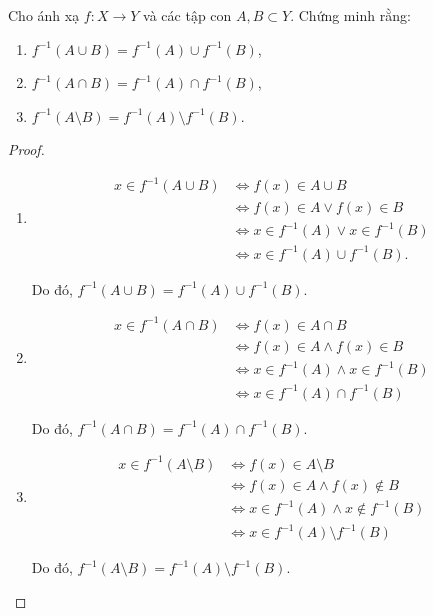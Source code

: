 \begin{exercise}Cho ánh xạ $f: X\rightarrow Y$ và các tập con $A, B\subset Y$. Chứng minh rằng:
    \begin{enumerate}[itemsep=0pt,label = (\alph*)]
        \item $f^{-1}(A\cup B) = f^{-1}(A)\cup f^{-1}(B)$,
        \item $f^{-1}(A\cap B) = f^{-1}(A)\cap f^{-1}(B)$,
        \item $f^{-1}(A\setminus B) = f^{-1}(A)\setminus f^{-1}(B)$.
    \end{enumerate}
\end{exercise}

\begin{proof}
    \begin{enumerate}[label = (\alph*)]
        \item
              \begin{align*}
                 x\in f^{-1}(A\cup B)  & \Longleftrightarrow  f(x) \in A\cup B                   \\
                  & \Longleftrightarrow  f(x)\in A \lor f(x)\in B           \\
                  & \Longleftrightarrow  x\in f^{-1}(A) \lor x\in f^{-1}(B) \\
                  & \Longleftrightarrow  x\in f^{-1}(A)\cup f^{-1}(B).
              \end{align*}

              Do đó, $f^{-1}(A\cup B) = f^{-1}(A)\cup f^{-1}(B)$.
        \item
              \begin{align*}
                x\in f^{-1}(A\cap B) &\Longleftrightarrow f(x) \in A\cap B                     \\
                  &\Longleftrightarrow f(x) \in A \land f(x) \in B         \\
                  &\Longleftrightarrow x\in f^{-1}(A) \land x\in f^{-1}(B) \\
                  &\Longleftrightarrow x\in f^{-1}(A)\cap f^{-1}(B)
              \end{align*}

              Do đó, $f^{-1}(A\cap B) = f^{-1}(A)\cap f^{-1}(B)$.
        \item
              \begin{align*}
                  x\in f^{-1}(A\setminus B) & \Longleftrightarrow f(x) \in A\setminus B                     \\
                  & \Longleftrightarrow f(x) \in A \land f(x) \not\in B          \\
                  & \Longleftrightarrow x\in f^{-1}(A) \land x \not\in f^{-1}(B) \\
                  & \Longleftrightarrow x\in f^{-1}(A)\setminus f^{-1}(B)
              \end{align*}

              \par Do đó, $f^{-1}(A\setminus B) = f^{-1}(A)\setminus f^{-1}(B)$.
    \end{enumerate}
\end{proof}

